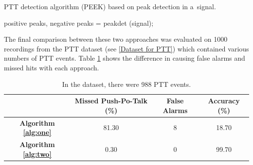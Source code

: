     \vspace{0.5cm}
    \begin{algorithm}
    \caption{PTT detection algorithm (PEEK) based on peak detection in a~signal.}\label{alg:two}
        \vspace{0.3cm}
        \SetNlSkip{-2.0em}
        \SetNlSty{}{}{:}
        \Indp
        \Indp 
        positive peaks, negative peaks = peakdet (signal);

    \end{algorithm}
    \vspace{0.3cm}

    The final comparison between these two approaches was evaluated on 1000 recordings from the PTT dataset (see \ref{Dataset for PTT}) which contained various numbers of PTT events.
    \newpage
    Table \ref{tab:comparisionapproaches} shows the difference in causing false alarms and missed hits with each approach. 

    \vspace{0.2cm}

    \begin{table}[ht!]
        \centering
        \begin{tabular}{|c|c|c|c|} \hline
            & \textbf{Missed Push-Po-Talk (\%)} & \textbf{False Alarms} & \textbf{Accuracy (\%)} \\ \hline
            \textbf{Algorithm \ref{alg:one}} & 81.30 & 8 & 18.70\\ \hline
            \textbf{Algorithm \ref{alg:two}} & 0.30 & 0 & 99.70\\ \hline
        \end{tabular}
        \caption{In the dataset, there were 988 PTT events.}
        \label{tab:comparisionapproaches}
    \end{table}

